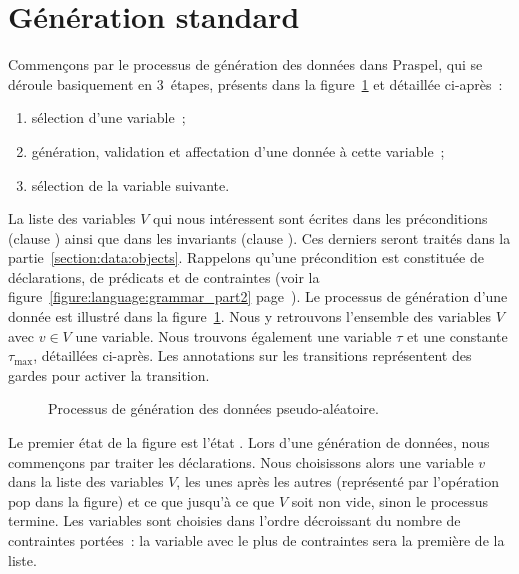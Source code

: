 \section{Génération standard}
\label{section:data:random}

Commençons par le processus de génération des données dans Praspel, qui se
déroule basiquement en 3~étapes, présents dans la
figure~\ref{figure:data:process} et détaillée ci-après~:

\begin{enumerate}

\item sélection d'une variable~;

\item génération, validation et affectation d'une donnée à cette variable~;

\item sélection de la variable suivante.

\end{enumerate}

La liste des variables $V$ qui nous intéressent sont écrites dans les
préconditions (clause \arequires) ainsi que dans les invariants (clause
\ainvariant). Ces derniers seront traités dans la
partie~\ref{section:data:objects}. Rappelons qu'une précondition est constituée
de déclarations, de prédicats et de contraintes (voir la
figure~\ref{figure:language:grammar_part2}
page~\pageref{figure:language:grammar_part2}). Le processus de génération d'une
donnée est illustré dans la figure~\ref{figure:data:process}. Nous y retrouvons
l'ensemble des variables $V$ avec $v \in V$ une variable. Nous trouvons
également une variable $\tau$ et une constante $\tau_\mathrm{max}$, détaillées
ci-après. Les annotations sur les transitions représentent des gardes pour
activer la transition.
%
\begin{figure}


\caption{\label{figure:data:process} Processus de génération des données
pseudo-aléatoire.}

\end{figure}

Le premier état de la figure est l'état . Lors d'une génération de
données, nous commençons par traiter les déclarations. Nous choisissons alors
une variable $v$ dans la liste des variables $V$, les unes après les autres
(représenté par l'opération $\mathrm{pop}$ dans la figure) et ce que jusqu'à ce
que $V$ soit non vide, sinon le processus termine. Les variables sont choisies
dans l'ordre décroissant du nombre de contraintes portées~: la variable avec le
plus de contraintes sera la première de la liste.

